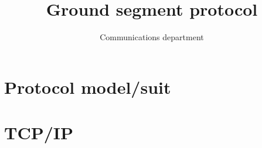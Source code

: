 \documentclass[12pt,a4paper]{article}
\title{Ground segment protocol}
\author{Communications department}
\begin{document}
\maketitle
\section{Protocol model/suit}


\section{TCP/IP}

\end{document}
